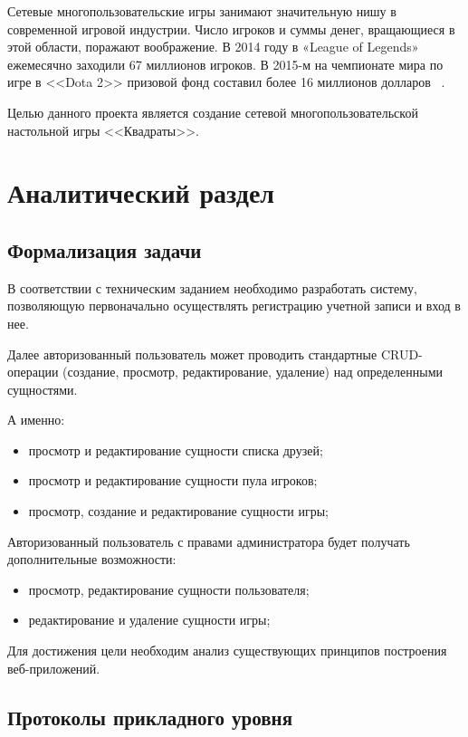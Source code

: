 \documentclass[a4paper,14pt]{extarticle}
\begin{document}
 	Сетевые многопользовательские игры занимают значительную нишу в современной игровой индустрии. Число игроков и суммы денег, вращающиеся в этой области, поражают воображение. В 2014 году в «League of Legends» ежемесячно заходили 67 миллионов игроков. В 2015-м на чемпионате мира по игре в <<Dota 2>> призовой фонд составил более 16 миллионов долларов ~\cite{games}.
 	
 	Целью данного проекта является создание сетевой многопользовательской настольной игры <<Квадраты>>.
 	
 	\newpage
 	
 	\section{Аналитический раздел}
 	
 	\subsection{Формализация задачи}
 	
 	В соответствии с техническим заданием необходимо разработать систему, позволяющую первоначально осуществлять регистрацию учетной записи и вход в нее.
 	
 	Далее авторизованный пользователь может проводить стандартные CRUD-операции (создание, просмотр, редактирование, удаление) над определенными сущностями.
 	
 	А именно:
 	\begin{itemize}
 		\item просмотр и редактирование сущности списка друзей;
 		\item просмотр и редактирование сущности пула игроков;
 		\item просмотр, создание и редактирование сущности игры;
 	\end{itemize}
 
 	Авторизованный пользователь с правами администратора будет получать дополнительные возможности:
 	\begin{itemize}
 		\item просмотр, редактирование сущности пользователя;
 		\item редактирование и удаление сущности игры;
 	\end{itemize}
 	
 	Для достижения цели необходим анализ существующих принципов построения веб-приложений.
 	
 	\subsection{Протоколы прикладного уровня}
 	
\end{document}
